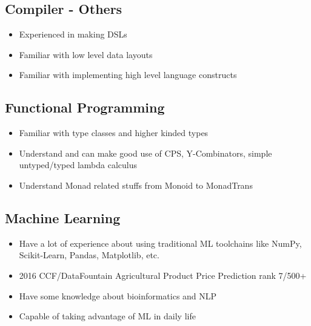 \documentclass{resume}
\begin{document}
\subsection{\textbf{Compiler - Others}}
\begin{itemize}
  \item Experienced in making DSLs
  \item Familiar with low level data layouts
  \item Familiar with implementing high level language constructs
\end{itemize}

\subsection{\textbf{Functional Programming}}
\begin{itemize}
  \item Familiar with type classes and higher kinded types
  \item Understand and can make good use of CPS, Y-Combinators, simple untyped/typed lambda calculus
  \item Understand Monad related stuffs from Monoid to MonadTrans
\end{itemize}

\subsection{\textbf{Machine Learning}}
\begin{itemize}
  \item Have a lot of experience about using traditional ML toolchains like NumPy, Scikit-Learn, Pandas, Matplotlib, etc.
  \item 2016 CCF/DataFountain Agricultural Product Price Prediction rank 7/500+
  \item Have some knowledge about bioinformatics and NLP
  \item Capable of taking advantage of ML in daily life
\end{itemize}
\end{document}
